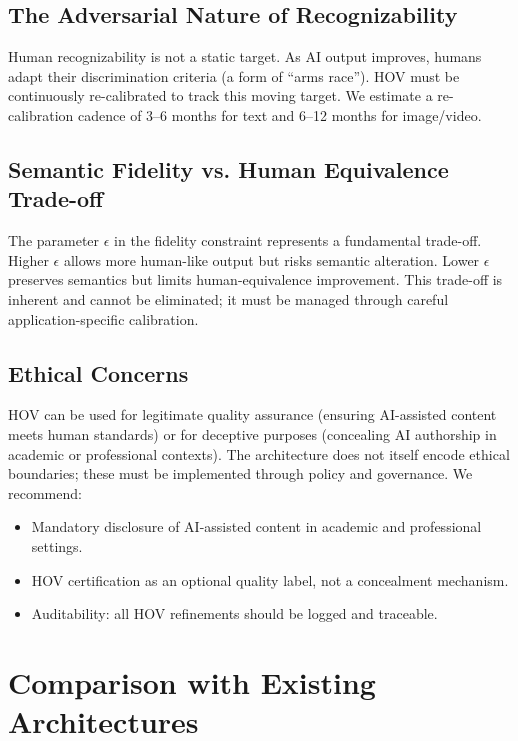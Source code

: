 \documentclass[12pt,oneside]{article}
\begin{document}
{{{{{{{{{{{\subsection{The Adversarial Nature of Recognizability}

Human recognizability is not a static target. As AI output improves, humans adapt their discrimination criteria (a form of ``arms race''). HOV must be continuously re-calibrated to track this moving target. We estimate a re-calibration cadence of 3--6 months for text and 6--12 months for image/video.

\subsection{Semantic Fidelity vs. Human Equivalence Trade-off}

The parameter $\epsilon$ in the fidelity constraint represents a fundamental trade-off. Higher $\epsilon$ allows more human-like output but risks semantic alteration. Lower $\epsilon$ preserves semantics but limits human-equivalence improvement. This trade-off is inherent and cannot be eliminated; it must be managed through careful application-specific calibration.

\subsection{Ethical Concerns}

HOV can be used for legitimate quality assurance (ensuring AI-assisted content meets human standards) or for deceptive purposes (concealing AI authorship in academic or professional contexts). The architecture does not itself encode ethical boundaries; these must be implemented through policy and governance. We recommend:
\begin{itemize}[noitemsep]
    \item Mandatory disclosure of AI-assisted content in academic and professional settings.
    \item HOV certification as an optional quality label, not a concealment mechanism.
    \item Auditability: all HOV refinements should be logged and traceable.
\end{itemize}

\section{Comparison with Existing Architectures}

}}}}}}}}}}}
\end{document}
